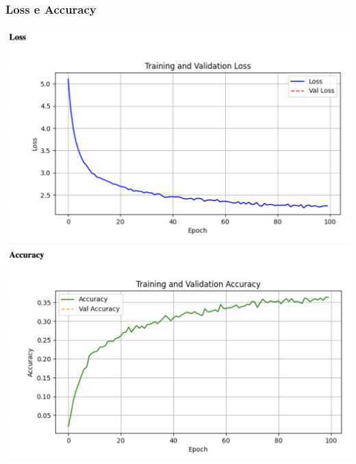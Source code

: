 \documentclass[12pt, letterpaper]{article}
\begin{document}
\subsubsection{Loss e Accuracy}
\includegraphics[width=1\textwidth]{immagini/loss.png}
\includegraphics[width=1\textwidth]{immagini/accuracy.png}\\
\end{document}
